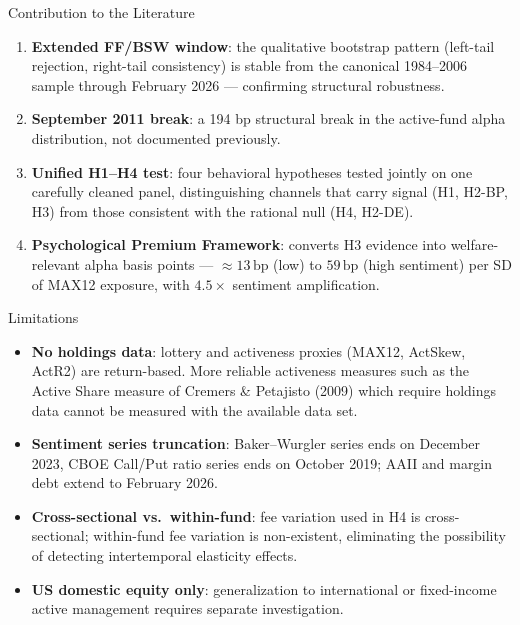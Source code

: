 \documentclass[10pt, aspectratio=169]{beamer}
\newcommand{\bp}{\,\text{bp}}
\begin{document}
\begin{frame}{Contribution to the Literature}
  \begin{enumerate}\itemsep6pt
    \item \textbf{Extended FF/BSW window}: the qualitative bootstrap pattern
          (left-tail rejection, right-tail consistency) is stable from the canonical
          1984–2006 sample through February 2026 — confirming structural robustness.
    \item \textbf{September 2011 break}: a 194 bp structural break in the active-fund
          alpha distribution, not documented previously.
    \item \textbf{Unified H1–H4 test}: four behavioral hypotheses tested jointly on one
          carefully cleaned panel, distinguishing channels that carry signal (H1, H2-BP, H3)
          from those consistent with the rational null (H4, H2-DE).
    \item \textbf{Psychological Premium Framework}: converts H3 evidence into
          welfare-relevant alpha basis points — $\approx 13\bp$ (low) to $59\bp$ (high
          sentiment) per SD of MAX12 exposure, with $4.5\times$ sentiment amplification.
  \end{enumerate}
\end{frame}

\begin{frame}{Limitations}
  \begin{itemize}\itemsep4pt
    \item \textbf{No holdings data}: lottery and activeness proxies (MAX12, ActSkew, ActR2) are return-based.
           More reliable activeness measures such as the Active Share measure of Cremers \& Petajisto (2009) which require holdings data cannot be measured with the available data set.
    \item \textbf{Sentiment series truncation}: Baker–Wurgler series ends on December 2023, CBOE Call/Put ratio series ends on October 2019;
          AAII and margin debt extend to February 2026.
    \item \textbf{Cross-sectional vs.\ within-fund}: fee variation used in H4 is
          cross-sectional; within-fund fee variation is non-existent, eliminating 
          the possibility of detecting intertemporal elasticity effects.
    \item \textbf{US domestic equity only}: generalization to international or
          fixed-income active management requires separate investigation.
  \end{itemize}
\end{frame}
\end{document}
